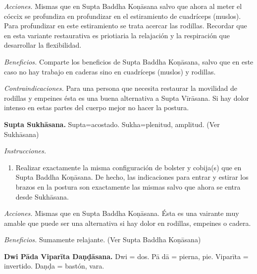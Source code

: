 \emph{Acciones.} Mismas que en Supta Baddha
Koṇāsana salvo que ahora al meter el cóccix
se profundiza en profundizar en el
estiramiento de cuadríceps (muslos). Para
profundizar en este estiramiento se trata
acercar las rodillas. Recordar que en esta
variante restaurativa es priotiaria la
relajación y la respiración que desarrollar
la flexibilidad.

\emph{Beneficios.} Comparte los beneficios de
Supta Baddha Koṇāsana, salvo que en este caso
no hay trabajo en caderas sino en cuadríceps
(muslos) y rodillas.

\emph{Contraindicaciones.} Para una persona
que necesita restaurar la movilidad de
rodillas y empeines ésta es una buena
alternativa a Supta Vīrāsana. Si hay dolor
intenso en estas partes del cuerpo mejor no
hacer la postura.

\medskip\noindent\textbf{Supta Sukhāsana.}
Supta=acostado. Sukha=plenitud, amplitud.
(Ver Sukhāsana)

\emph{Instrucciones.}
\begin{enumerate}
\item Realizar exactamente la misma
configuración de bolster y cobija(s) que en
Supta Baddha Koṇāsana. De hecho, las
indicaciones para entrar y estirar los brazos
en la postura son exactamente las mismas
salvo que ahora se entra desde Sukhāsana.
\end{enumerate}

\emph{Acciones.} Mismas que en Supta Baddha
Koṇāsana. Ésta es una vairante muy amable que
puede ser una alternativa si hay dolor en
rodillas, empeines o cadera.

\emph{Beneficios.} Sumamente relajante. (Ver
Supta Baddha Koṇāsana)

\medskip\noindent\textbf{Dwi Pāda Viparīta
Daṇḍāsana.}
Dwi = dos. Pā dā = pierna, pie. Viparīta =
invertido. Daṇḍa = bastón, vara.

